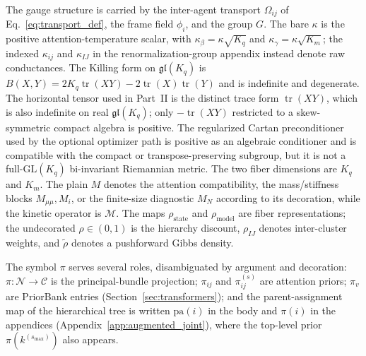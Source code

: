 \documentclass[11pt]{article}
\begin{document}
The gauge structure is carried by the inter-agent transport $\Omega_{ij}$ of Eq.~\eqref{eq:transport_def}, the frame field $\phi_i$, and the group $G$. The bare $\kappa$ is the positive attention-temperature scalar, with $\kappa_\beta=\kappa\sqrt{K_q}$ and $\kappa_\gamma=\kappa\sqrt{K_m}$; the indexed $\kappa_{ij}$ and $\kappa_{IJ}$ in the renormalization-group appendix instead denote raw conductances. The Killing form on $\mathfrak{gl}(K_q)$ is $B(X,Y)=2K_q\operatorname{tr}(XY)-2\operatorname{tr}(X)\operatorname{tr}(Y)$ and is indefinite and degenerate. The horizontal tensor used in Part~II is the distinct trace form $\operatorname{tr}(XY)$, which is also indefinite on real $\mathfrak{gl}(K_q)$; only $-\operatorname{tr}(XY)$ restricted to a skew-symmetric compact algebra is positive. The regularized Cartan preconditioner used by the optional optimizer path is positive as an algebraic conditioner and is compatible with the compact or transpose-preserving subgroup, but it is not a full-$\mathrm{GL}(K_q)$ bi-invariant Riemannian metric. The two fiber dimensions are $K_q$ and $K_m$. The plain $M$ denotes the attention compatibility, the mass/stiffness blocks $M_{\mu\mu},M_i$, or the finite-size diagnostic $M_N$ according to its decoration, while the kinetic operator is $\mathcal{M}$. The maps $\rho_{\mathrm{state}}$ and $\rho_{\mathrm{model}}$ are fiber representations; the undecorated $\rho\in(0,1)$ is the hierarchy discount, $\rho_{IJ}$ denotes inter-cluster weights, and $\widetilde{\rho}$ denotes a pushforward Gibbs density.

The symbol $\pi$ serves several roles, disambiguated by argument and decoration: $\pi: \mathcal{N} \to \mathcal{C}$ is the principal-bundle projection; $\pi_{ij}$ and $\pi^{(s)}_{ij}$ are attention priors; $\pi_v$ are PriorBank entries (Section~\ref{sec:transformers}); and the parent-assignment map of the hierarchical tree is written $\mathrm{pa}(i)$ in the body and $\pi(i)$ in the appendices (Appendix~\ref{app:augmented_joint}), where the top-level prior $\pi(k^{(s_{\max})})$ also appears.
\end{document}
